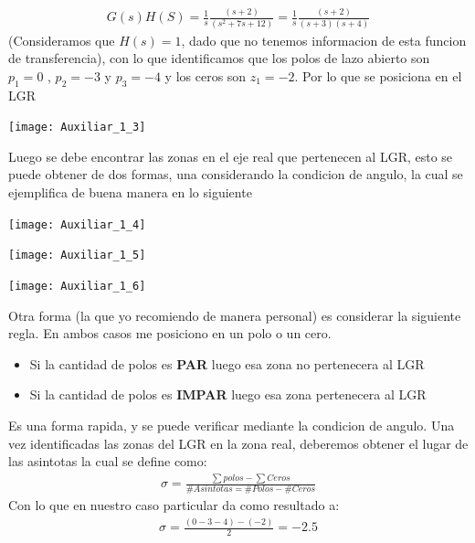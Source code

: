 \documentclass[
  11pt,
  letterpaper,
   addpoints,
   answers
  ]{exam}
\begin{document}
\begin{questions}
\begin{solution}
\begin{align}
    G(s)H(S)= \frac{1}{s} \frac{(s+2)}{(s^{2} +7s +12)} = \frac{1}{s} \frac{(s+2)}{(s+3)(s+4)}
\end{align}
(Consideramos que $H(s)=1$, dado que no tenemos informacion de esta funcion de transferencia), con lo que identificamos que los polos de lazo abierto son $p_1=0$ , $p_2=-3$ y $p_3=-4$ y los ceros son $z_1=-2$. Por lo que se posiciona en el LGR
\begin{center}
    \texttt{[image: Auxiliar\_1\_3]}
  \end{center}
Luego se debe encontrar las zonas en el eje real que pertenecen al LGR, esto se puede obtener de dos formas, una considerando la condicion de angulo, la cual se ejemplifica de buena manera en lo siguiente
\begin{center}
    \texttt{[image: Auxiliar\_1\_4]}
\end{center}
\begin{center}
    \texttt{[image: Auxiliar\_1\_5]}
\end{center}
\begin{center}
    \texttt{[image: Auxiliar\_1\_6]}
  \end{center}
Otra forma (la que yo recomiendo de manera personal) es considerar la siguiente regla. En ambos casos me posiciono en un polo o un cero.
\begin{itemize}
    \item Si la cantidad de polos es \textbf{PAR} luego esa zona no pertenecera al LGR
    \item Si la cantidad de polos es \textbf{IMPAR} luego esa zona pertenecera al LGR
\end{itemize}
Es una forma rapida, y se puede verificar mediante la condicion de angulo. Una vez identificadas las zonas del LGR en la zona real, deberemos obtener el lugar de las asintotas la cual se define como:
\begin{align}
    \sigma = \frac{\sum polos - \sum Ceros}{ \# Asintotas = \# Polos - \# Ceros}
\end{align}
Con lo que en nuestro caso particular da como resultado a:
\begin{align}
    \sigma = \frac{(0-3-4 )-(-2)}{2} = -2.5
\end{align}
\begin{center}

\end{center}
\end{solution}
\end{questions}
\end{document}
